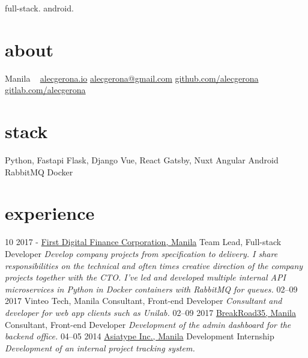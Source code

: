 \documentclass[]{friggeri-cv}
\begin{document}
       {full-stack. android.}


\begin{aside}
  \section{about}
    Manila
    ~
    \href{https://alecgerona.io}{alecgerona.io}
    \href{mailto:alecgerona.com}{alecgerona@gmail.com}
    \href{github.com/alecgerona}{github.com/alecgerona}
    \href{https://gitlab.com/alecgerona}{gitlab.com/alecgerona}
  \section{stack}
    Python, Fastapi
    Flask, Django
    Vue, React
    Gatsby, Nuxt
    Angular
    Android
    RabbitMQ
    Docker
\end{aside}

\section{experience}

\begin{entrylist}
  \entry
    {10 2017 -}
    {\href{firstdigitalfinance.com}{First Digital Finance Corporation, Manila}}
    {Team Lead, Full-stack Developer}
    {\emph{Develop company projects from specification to delivery. I share responsibilities on the technical and often times creative direction of the company projects together with the CTO. I've led and developed multiple internal API microservices in Python in Docker containers with RabbitMQ for queues.
}}
  \entry
    {02–09 2017}
    {Vinteo Tech, Manila}
    {Consultant, Front-end Developer}
    {\emph{Consultant and developer for web app clients such as Unilab.}}
  \entry
    {02–09 2017}
    {\href{http://breakroad.com/}{BreakRoad35, Manila}}
    {Consultant, Front-end Developer}
    {\emph{Development of the admin dashboard for the backend office.}}
  \entry
    {04–05 2014}
    {\href{http://www.asiatype.com/}{Asiatype Inc., Manila}}
    {Development Internship}
    {\emph{Development of an internal project tracking system.}}
\end{entrylist}
\end{document}
